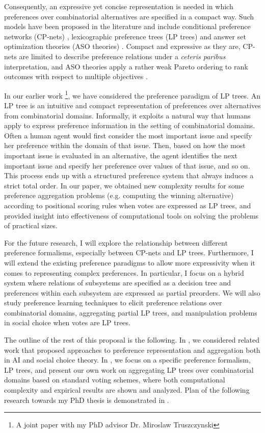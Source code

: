 Consequently, an expressive yet concise representation is needed in which
preferences over combinatorial alternatives are specified
in a compact way.
Such models have been proposed in the literature and include
conditional preference networks (CP-nets) \cite{Kaci:Pref}, 
lexicographic preference trees (LP trees) \cite{booth:learningLP} and
answer set optimization theories (ASO theories) \cite{Brewka:ASO,Brewka04}.
Compact and expressive as they are, CP-nets are limited
to describe preference relations under a 
\textit{ceteris paribus} interpretation, and
ASO theories apply a rather weak Pareto ordering
to rank outcomes with respect to multiple objectives \cite{Brewka:ASO}.

In our earlier work \cite{LiuT}\footnote{A joint paper with my PhD advisor
Dr. Miroslaw Truszczynski}, 
we have considered the preference paradigm of LP trees.
An LP tree is an intuitive and compact representation
of preferences over alternatives from combinatorial domains.
Informally, it exploits a natural way that humans apply to
express preference information in the setting of combinatorial domains.
Often a human agent would first consider the most important issue and
specify her preference within the domain of that issue.  Then,
based on how the most important issue is evaluated in an alternative,
the agent identifies the next important issue and specify her preference
over values of that issue, and so on.
This process ends up with a structured preference system that always
induces a strict total order.
In our paper, we obtained new complexity results for some preference
aggregation problems (e.g. computing the winning alternative)
according to positional scoring rules when votes are expressed as
LP trees, and provided insight into effectiveness of computational
tools on solving the problems of practical sizes.

For the future research, I will explore the relationship
between different preference formalisms, especially between
CP-nets and LP trees.
Furthermore, I will extend the existing
preference paradigms to allow more expressivity when it
comes to representing complex preferences.
In particular, I focus on a hybrid system where
relations of subsystems are specified as a decision tree
and preferences within each subsystem are expressed as
partial preorders.
We will also study preference learning techniques to
elicit preference relations over combinatorial domains,
aggregating partial LP trees, and manipulation problems
in social choice when votes are LP trees.

The outline of the rest of this proposal is the following. 
In , we considered related work that proposed
approaches to preference representation and aggregation both
in AI and social choice theory.
In , we focus on a specific preference formalism,
LP trees, and present our own work on aggregating LP trees
over combinatorial domains based on standard voting schemes, 
where both computational complexity
and expirical results are shown and analyzed. 
Plan of the following research towards my PhD thesis
is demonstrated in .
